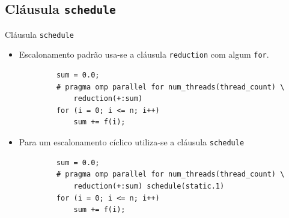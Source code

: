 	\subsection{Cláusula {\tt schedule}}
	\begin{frame}[fragile]{Cláusula {\tt schedule}}
		\begin{itemize}
			\item Escalonamento padrão usa-se a cláusula {\tt reduction} com algum {\tt for}.
		\end{itemize}
		\begin{verbatim}
			sum = 0.0;
			# pragma omp parallel for num_threads(thread_count) \
				reduction(+:sum)		
			for (i = 0; i <= n; i++)
				sum += f(i);
		\end{verbatim}

		\begin{itemize}
			\item Para um escalonamento cíclico utiliza-se a cláusula {\tt schedule}
		\end{itemize}
		
		\begin{verbatim}
			sum = 0.0;
			# pragma omp parallel for num_threads(thread_count) \
				reduction(+:sum) schedule(static.1)
			for (i = 0; i <= n; i++)
				sum += f(i);
		\end{verbatim}
\end{frame}

